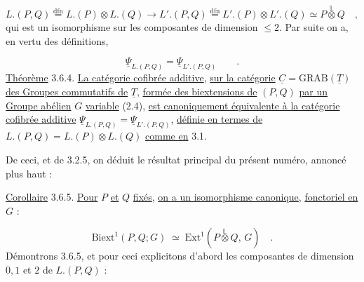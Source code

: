 \begin{equation}\tag{3.6.2}
L.(P,Q) \overset{\mathrm{dfn}}{=} L.(P) \otimes L.(Q) \longrightarrow L'.(P,Q) \overset{\mathrm{dfn}}{=} L'.(P) \otimes L'.(Q) \simeq P \overset{\mathbb{L}}{\otimes} Q \quad ,
\end{equation}
qui est un isomorphisme sur les composantes de dimension $\leq 2$. Par suite on a, en vertu des définitions,

\begin{equation}\tag{3.6.3}
\underline{\Psi}_{L.(P,Q)} = \underline{\Psi}_{L'.(P,Q)} \qquad .
\end{equation}
\underline{Théorème} 3.6.4. \underline{La catégorie cofibrée additive}, \underline{sur la catégorie} $\underline{C} = \mathrm{GRAB}(\underline{T})$ \underline{des Groupes commutatifs de} $\underline{T}$, \underline{formée des biextensions de} $(P,Q)$ \underline{par un Groupe abélien} $G$ \underline{variable} (2.4), \underline{est canoniquement équivalente à la catégorie cofibrée additive} $\underline{\Psi}_{L.(P,Q)} = \underline{\Psi}_{L'.(P,Q)}$, \underline{définie en termes de} $L.(P,Q) = L.(P) \otimes L.(Q)$ \underline{comme en} 3.1.

De ceci, et de 3.2.5, on déduit le résultat principal du présent numéro, annoncé plus haut :



\underline{Corollaire} 3.6.5. \underline{Pour} $P$ \underline{et} $Q$ \underline{fixés}, \underline{on a un isomorphisme canonique,} \underline{fonctoriel en} $G$ :

\begin{equation}\tag{3.6.5.1}
\mathrm{Biext}^1(P,Q;G) \;\simeq\; \mathrm{Ext}^1(P \overset{\mathbb{L}}{\otimes} Q,\, G) \quad .
\end{equation}
Démontrons 3.6.5, et pour ceci explicitons d'abord les composantes de dimension $0,1$ et $2$ de $L.(P,Q)$ :

